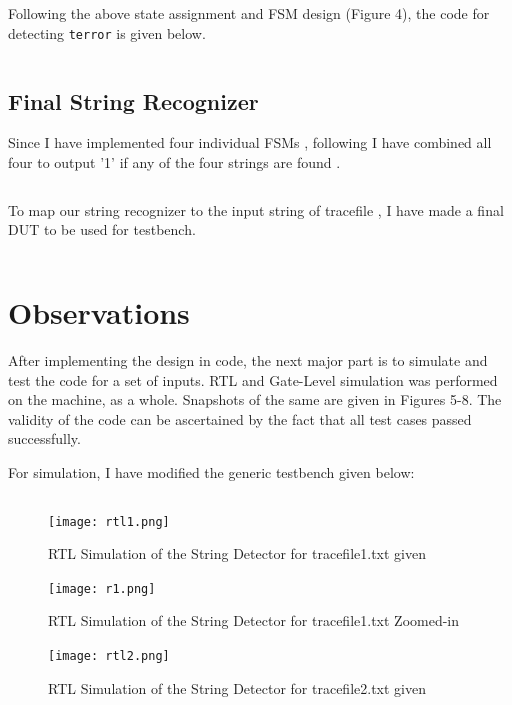 \documentclass[a4paper, 11pt]{article}
\begin{document}
Following the above state assignment and FSM design (Figure 4), the code for detecting \texttt{terror} is given below.
\inputminted[linenos]{vhdl}{TERROR.vhd}

\subsection*{Final String Recognizer}

Since I have implemented four individual FSMs , following I have combined all four to output '1' if any of the four strings are found . 
\inputminted[linenos]{vhdl}{string_recognizer.vhd}

To map our string recognizer to the input string of tracefile , I have made a final DUT to be used for testbench.
\inputminted[linenos]{vhdl}{DUT.vhd}



\section{Observations}
After implementing the design in code, the next major part is to simulate and test the code for a set of inputs. RTL and Gate-Level simulation was performed on the machine, as a whole. Snapshots of the same are given in Figures 5-8. The validity of the code can be ascertained by the fact that all test cases passed successfully.

For simulation, I have modified the generic testbench given below:
\inputminted[linenos]{vhdl}{Testbench.vhd}
\begin{figure}[H]
\centering
\texttt{[image: rtl1.png]}
\caption{RTL Simulation of the String Detector for tracefile1.txt given }
\end{figure}

\begin{figure}[H]
\centering
\texttt{[image: r1.png]}
\caption{RTL Simulation of the String Detector for tracefile1.txt Zoomed-in }
\end{figure}

\begin{figure}[H]
\centering
\texttt{[image: rtl2.png]}
\caption{RTL Simulation of the String Detector for tracefile2.txt given }
\end{figure}
\end{document}
